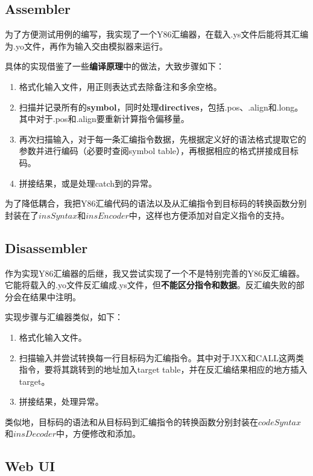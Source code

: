 \subsection{Assembler}

为了方便测试用例的编写，我实现了一个Y86汇编器，在载入.ys文件后能将其汇编为.yo文件，再作为输入交由模拟器来运行。

具体的实现借鉴了一些{\bf 编译原理}中的做法，大致步骤如下：

\begin{enumerate}
\item 格式化输入文件，用正则表达式去除备注和多余空格。
\item 扫描并记录所有的{\bf symbol}，同时处理{\bf directives}，包括.pos、.align和.long。其中对于.pos和.align要重新计算指令偏移量。
\item 再次扫描输入，对于每一条汇编指令数据，先根据定义好的语法格式提取它的参数并进行编码（必要时查阅symbol table），再根据相应的格式拼接成目标码。
\item 拼接结果，或是处理catch到的异常。
\end{enumerate}

为了降低耦合，我把Y86汇编代码的语法以及从汇编指令到目标码的转换函数分别封装在了$insSyntax$和$insEncoder$中，这样也方便添加对自定义指令的支持。

\subsection{Disassembler}

作为实现Y86汇编器的后继，我又尝试实现了一个不是特别完善的Y86反汇编器。它能将载入的.yo文件反汇编成.ys文件，但{\bf 不能区分指令和数据}。反汇编失败的部分会在结果中注明。

实现步骤与汇编器类似，如下：

\begin{enumerate}
\item 格式化输入文件。
\item 扫描输入并尝试转换每一行目标码为汇编指令。其中对于JXX和CALL这两类指令，要将其跳转到的地址加入target table，并在反汇编结果相应的地方插入target。
\item 拼接结果，处理异常。
\end{enumerate}

类似地，目标码的语法和从目标码到汇编指令的转换函数分别封装在$codeSyntax$和$insDecoder$中，方便修改和添加。

\subsection{Web UI}

